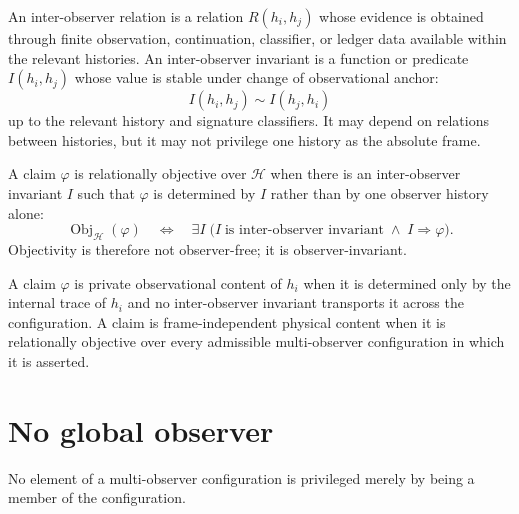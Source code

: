 \begin{definition}
\label{def:reality-inter-observer-relation-invariant}
An inter-observer relation is a relation $R(h_i,h_j)$ whose evidence is obtained through finite observation, continuation, classifier, or ledger data available within the relevant histories. An inter-observer invariant is a function or predicate $I(h_i,h_j)$ whose value is stable under change of observational anchor:
$$
I(h_i,h_j)\sim I(h_j,h_i)
$$
up to the relevant history and signature classifiers. It may depend on relations between histories, but it may not privilege one history as the absolute frame.
\end{definition}

\begin{definition}
\label{def:relational-objectivity}
A claim $\varphi$ is relationally objective over $\mathcal H$ when there is an inter-observer invariant $I$ such that $\varphi$ is determined by $I$ rather than by one observer history alone:
$$
\operatorname{Obj}_{\mathcal H}(\varphi)
\quad\Longleftrightarrow\quad
\exists I\;
\bigl(
I\;\text{is inter-observer invariant}
\;\wedge\;
I\Rightarrow\varphi
\bigr).
$$
Objectivity is therefore not observer-free; it is observer-invariant.
\end{definition}

\begin{definition}
\label{def:private-frame-independent-content}
A claim $\varphi$ is private observational content of $h_i$ when it is determined only by the internal trace of $h_i$ and no inter-observer invariant transports it across the configuration. A claim is frame-independent physical content when it is relationally objective over every admissible multi-observer configuration in which it is asserted.
\end{definition}

\section{No global observer}
\label{sec:no-global-observer}

\begin{theorem}
\label{thm:no-member-privileged-by-membership}
No element of a multi-observer configuration is privileged merely by being a member of the configuration.
\end{theorem}


